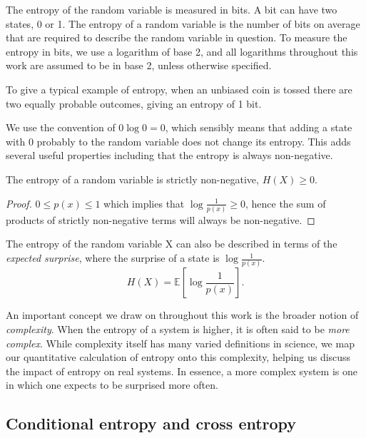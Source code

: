 The entropy of the random variable is measured in bits. A bit can have two states, 0 or 1. The entropy of a random variable is the number of bits on average that are required to describe the random variable in question. To measure the entropy in bits, we use a logarithm of base 2, and all logarithms throughout this work are assumed to be in base 2, unless otherwise specified.

To give a typical example of entropy, when an unbiased coin is tossed there are two equally probable outcomes, giving an entropy of 1 bit. 

\begin{remark}
We use the convention of $0\log 0 = 0$, which sensibly means that adding a state with 0 probably to the random variable does not change its entropy. This adds several useful properties including that the entropy is always non-negative.
\end{remark}

\begin{lemma}
	The entropy of a random variable is strictly non-negative, $H(X) \geq 0$.
\end{lemma}

\begin{proof}
	$0 \leq p(x) \leq 1$ which implies that $\log \frac{1}{p(x)} \geq 0$,
	hence the sum of products of strictly non-negative terms will always be non-negative. 
\end{proof}

\begin{remark}
	The entropy of the random variable X can also be described in terms of the \emph{expected surprise}, where the surprise of a state is $\log \frac{1}{p(x)}$.
	\begin{equation}
		H(X) = \mathbb{E} \left[ \log  \frac{1}{p(x)} \right].
	\end{equation}
\end{remark}	

An important concept we draw on throughout this work is the broader notion of \emph{complexity}. When the entropy of a system is higher, it is often said to be \emph{more complex}. While complexity itself has many varied definitions in science, we map our quantitative calculation of entropy onto this complexity, helping us discuss the impact of entropy on real systems. In essence, a more complex system is one in which one expects to be surprised more often.

\subsection{Conditional entropy and cross entropy}

